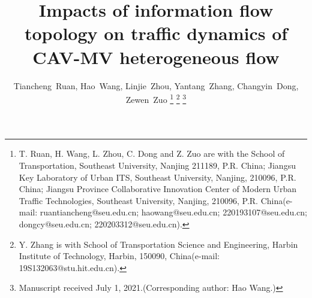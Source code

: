 \documentclass[journal]{IEEEtran}
\begin{document}
%
\title{Impacts of information flow topology on traffic dynamics of CAV-MV heterogeneous flow}
%
%
%

\author{Tiancheng~Ruan,
        Hao~Wang,
        Linjie~Zhou,
        Yantang~Zhang,
        Changyin~Dong,
        Zewen~Zuo
\thanks{T. Ruan,  H. Wang, L. Zhou, C. Dong and Z. Zuo are with the
School of Transportation, Southeast University, Nanjing 211189, P.R. China;
Jiangsu Key Laboratory of Urban ITS, Southeast University, Nanjing, 210096, P.R. China;
Jiangsu Province Collaborative Innovation Center of Modern Urban Traffic Technologies, Southeast University, Nanjing, 210096, P.R. China(e-mail: ruantiancheng@seu.edu.cn;  haowang@seu.edu.cn; 220193107@seu.edu.cn;
dongcy@seu.edu.cn; 220203312@seu.edu.cn).}%
\thanks{Y. Zhang is with School of Transportation Science and Engineering, Harbin Institute of Technology, Harbin, 150090,  China(e-mail: 19S132063@stu.hit.edu.cn).}%
\thanks{Manuscript received July 1, 2021.(Corresponding author: Hao Wang.)}}

% 
%
\end{document}
